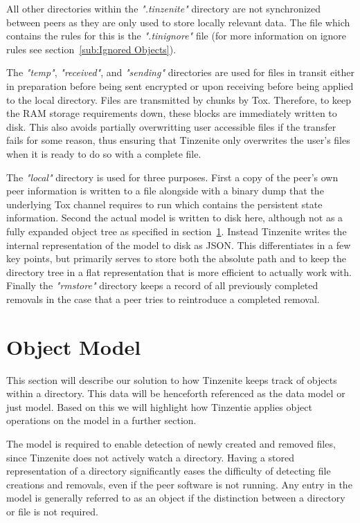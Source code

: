 All other directories within the \textit{".tinzenite"} directory are not synchronized between peers as they are only used to store locally relevant data.
The file which contains the rules for this is the \textit{".tinignore"} file (for more information on ignore rules see section~\ref{sub:Ignored Objects}).

The \textit{"temp"}, \textit{"received"}, and \textit{"sending"} directories are used for files in transit either in preparation before being sent encrypted or upon receiving before being applied to the local directory.
Files are transmitted by chunks by Tox.
Therefore, to keep the RAM storage requirements down, these blocks are immediately written to disk.
This also avoids partially overwritting user accessible files if the transfer fails for some reason, thus ensuring that Tinzenite only overwrites the user's files when it is ready to do so with a complete file.

The \textit{"local"} directory is used for three purposes.
First a copy of the peer's own peer information is written to a file alongside with a binary dump that the underlying Tox channel requires to run which contains the persistent state information.
Second the actual model is written to disk here, although not as a fully expanded object tree as specified in section~\ref{sec:Object Model}.
Instead Tinzenite writes the internal representation of the model to disk as JSON.
This differentiates in a few key points, but primarily serves to store both the absolute path and to keep the directory tree in a flat representation that is more efficient to actually work with.
Finally the \textit{"rmstore"} directory keeps a record of all previously completed removals in the case that a peer tries to reintroduce a completed removal.

\section{Object Model}
\label{sec:Object Model}

This section will describe our solution to how Tinzenite keeps track of objects within a directory.
This data will be henceforth referenced as the data model or just model.
Based on this we will highlight how Tinzentie applies object operations on the model in a further section.

The model is required to enable detection of newly created and removed files, since Tinzenite does not actively watch a directory.
Having a stored representation of a directory significantly eases the difficulty of detecting file creations and removals, even if the peer software is not running.
Any entry in the model is generally referred to as an object if the distinction between a directory or file is not required.

